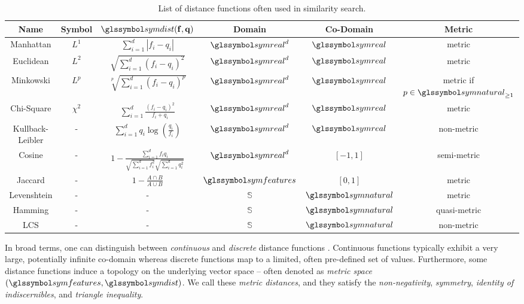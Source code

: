 \begin{table}[hb]
    \begin{tabular}{ | c | c | c | c | c | c |}
        \hline
        \textbf{Name} & \textbf{Symbol} &  $\symdist \mathbf{(f,q)}$ & \textbf{Domain} & \textbf{Co-Domain} & \textbf{Metric} \\
        \hline
        \hline 
        Manhattan & $L^1$ & $\sum_{i=1}^{d} | f_i - q_i |$ & $\symreal^d$ & $\symreal$ & metric \\ 
        \hline
        Euclidean & $L^2$ & $\sqrt{\sum_{i=1}^{d} (f_i - q_i)^2}$ & $\symreal^d$ & $\symreal$ & metric \\  
        \hline
        Minkowski & $L^p$ & $\sqrt[p]{\sum_{i=1}^{d} (f_i - q_i)^p}$ & $\symreal^d$ & $\symreal$ & metric if $p \in \symnatural_{\geq 1}$ \\ 
        \hline
        Chi-Square & $\chi^2$ & $\sum_{i=1}^{d} \frac{(f_i - q_i)^2}{f_i + q_i}$ & $\symreal^d$ & $\symreal$ & metric \\ 
        \hline
        Kullback-Leibler & - & $\sum_{i=1}^{d} q_i \log (\frac{q_i}{f_i})$ & $\symreal^d$ & $\symreal$ & non-metric \\ 
        \hline
        Cosine & - & $1 - \frac{\sum_{i=1}^{d} f_{i}q_{i}}{\sqrt{\sum_{i=1}^{d} f_i^2} \sqrt{\sum_{i=1}^{d} q_i^2}}$ & $\symreal^d$ & $[-1, 1]$ & semi-metric \\  
        \hline
        Jaccard & - & $1 - \frac{A \cap B}{A \cup B}$ & $\symfeatures$ & $[0, 1]$ & metric \\
        \hline
        Levenshtein \cite{Levensthtein:1965Binary} & - & - & $\mathbb{S}$ & $\symnatural$ & metric \\
        \hline
        Hamming & - & - &  $\mathbb{S}$ & $\symnatural$ & quasi-metric \\
        \hline
        LCS \cite{Hirschberg:1977Algorithms} & - & - &  $\mathbb{S}$ & $\symnatural$ & non-metric \\
        \hline
    \end{tabular}
    \caption{List of distance functions often used in similarity search.}
    \label{table:similarity_measures}
\end{table}

In broad terms, one can distinguish between \emph{continuous} and \emph{discrete} distance functions \cite{Zezula:2006Similarity}. Continuous functions typically exhibit a very large, potentially infinite co-domain whereas discrete functions map to a limited, often pre-defined set of values. Furthermore, some distance functions induce a topology on the underlying vector space -- often denoted as  \emph{metric space} $(\symfeatures, \symdist)$. We call these \emph{metric distances}, and they satisfy the \emph{non-negativity}, \emph{symmetry}, \emph{identity of indiscernibles}, and \emph{triangle inequality}. 

